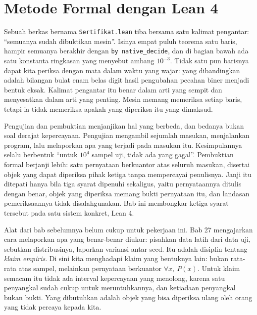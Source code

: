 \chapter{Metode Formal dengan Lean 4}

Sebuah berkas bernama \texttt{Sertifikat.lean} tiba bersama satu kalimat pengantar: ``semuanya
sudah dibuktikan mesin''. Isinya empat puluh teorema satu baris, hampir semuanya berakhir dengan
\texttt{by native\_decide}, dan di bagian bawah ada satu konstanta ringkasan yang menyebut ambang
$10^{-3}$. Tidak satu pun barisnya dapat kita periksa dengan mata dalam waktu yang wajar: yang
dibandingkan adalah bilangan bulat enam belas digit hasil pengubahan pecahan biner menjadi bentuk
eksak. Kalimat pengantar itu benar dalam arti yang sempit dan menyesatkan dalam arti yang penting.
Mesin memang memeriksa setiap baris, tetapi ia tidak memeriksa apakah yang diperiksa itu yang
dimaksud.

Pengujian dan pembuktian menjanjikan hal yang berbeda, dan bedanya bukan soal derajat
kepercayaan. Pengujian mengambil sejumlah masukan, menjalankan program, lalu melaporkan apa yang
terjadi pada masukan itu. Kesimpulannya selalu berbentuk ``untuk $10^{4}$ sampel uji, tidak ada
yang gagal''. Pembuktian formal berjanji lebih: satu pernyataan berkuantor atas seluruh masukan,
disertai objek yang dapat diperiksa pihak ketiga tanpa mempercayai penulisnya. Janji itu
ditepati hanya bila tiga syarat dipenuhi sekaligus, yaitu pernyataannya ditulis dengan benar,
objek yang diperiksa memang bukti pernyataan itu, dan landasan pemeriksaannya tidak disalahgunakan.
Bab ini membongkar ketiga syarat tersebut pada satu sistem konkret, Lean 4.

Alat dari bab sebelumnya belum cukup untuk pekerjaan ini. Bab 27 mengajarkan cara melaporkan
apa yang benar-benar diukur: pisahkan data latih dari data uji, sebutkan distribusinya, laporkan
variansi antar seed. Itu adalah disiplin tentang \emph{klaim empiris}. Di sini kita menghadapi
klaim yang bentuknya lain: bukan rata-rata atas sampel, melainkan pernyataan berkuantor
$\forall x,\ P(x)$. Untuk klaim semacam itu tidak ada interval kepercayaan yang menolong, karena
satu penyangkal sudah cukup untuk meruntuhkannya, dan ketiadaan penyangkal bukan bukti. Yang
dibutuhkan adalah objek yang bisa diperiksa ulang oleh orang yang tidak percaya kepada kita.

